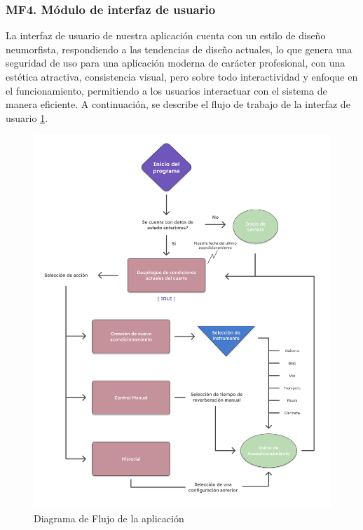 \subsubsection{MF4. Módulo de interfaz de usuario}

La interfaz de usuario de nuestra aplicación cuenta con un estilo de diseño neumorfista, respondiendo a las tendencias de diseño actuales, lo que genera una seguridad de uso 
para una aplicación moderna de carácter profesional, con una estética atractiva, consistencia visual, pero sobre todo interactividad y enfoque en el funcionamiento, permitiendo 
a los usuarios interactuar con el sistema de manera eficiente. A continuación, se describe el flujo de trabajo de la interfaz de usuario \ref{fig:diagrama_flujo}. \\

\begin{figure}[!htb]
    \centering
    \includegraphics[width=1\linewidth]{imagenes/Diagrama de Flujo.png}
    \caption{Diagrama de Flujo de la aplicación}
    \label{fig:diagrama_flujo}
\end{figure}

